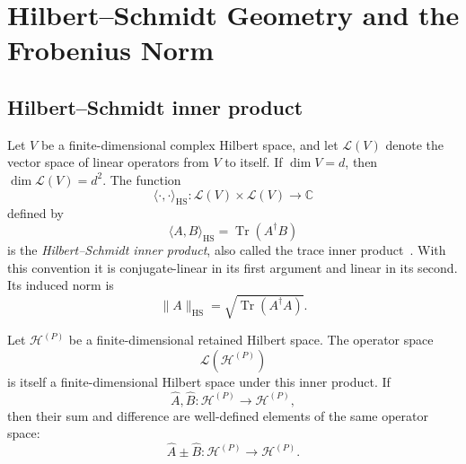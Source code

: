 \chapter{Hilbert--Schmidt Geometry and the Frobenius Norm}

\label{app:hilbert-schmidt-and-frobenius}


\section{Hilbert--Schmidt inner product}


Let $V$ be a finite-dimensional complex Hilbert space, and let
$\mathcal L(V)$ denote the vector space of linear operators from $V$ to itself.
If $\dim V=d$, then $\dim\mathcal L(V)=d^2$. The function
\begin{equation}
    \langle\cdot,\cdot\rangle_{\mathrm{HS}}:
    \mathcal L(V)\times\mathcal L(V)
    \longrightarrow
    \mathbb C
\end{equation}
defined by
\begin{equation}
    \langle A,B\rangle_{\mathrm{HS}}
    =
    \operatorname{Tr}\!\left(A^\dagger B\right)
\end{equation}
is the \emph{Hilbert--Schmidt inner product}, also called the trace inner
product~\cite{nielsenchuang2010}. With this convention it is conjugate-linear
in its first argument and linear in its second. Its induced norm is
\begin{equation}
    \lVert A\rVert_{\mathrm{HS}}
    =
    \sqrt{
        \operatorname{Tr}\!\left(A^\dagger A\right)
    }.
\end{equation}

Let $\mathcal H^{(P)}$ be a finite-dimensional retained Hilbert space. The
operator space
\begin{equation}
    \mathcal L\!\left(\mathcal H^{(P)}\right)
\end{equation}
is itself a finite-dimensional Hilbert space under this inner product. If
\begin{equation}
    \hat A,\hat B:
    \mathcal H^{(P)}
    \longrightarrow
    \mathcal H^{(P)},
\end{equation}
then their sum and difference are well-defined elements of the same operator
space:
\begin{equation}
    \hat A\pm\hat B:
    \mathcal H^{(P)}
    \longrightarrow
    \mathcal H^{(P)}.
\end{equation}

